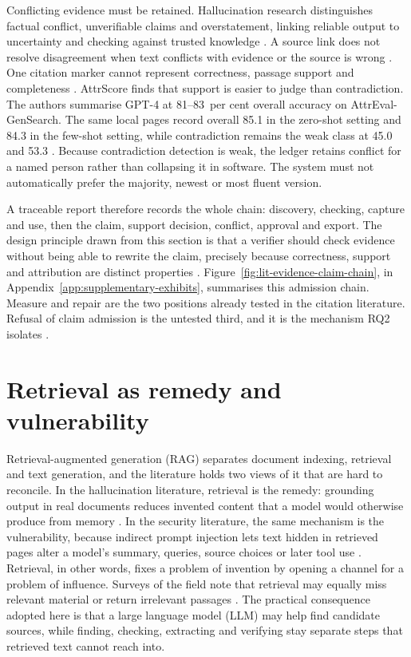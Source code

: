 Conflicting evidence must be retained. Hallucination research distinguishes factual conflict,
unverifiable claims and overstatement, linking reliable output to uncertainty and checking
against trusted knowledge \citep{huang2023hallucination}. A source link does not resolve
disagreement when text conflicts with evidence or the source is wrong \citep{gao2023rarr}. One
citation marker cannot represent correctness, passage support and completeness
\citep{gao2023alce}. AttrScore finds that support is easier to judge than contradiction. The authors summarise GPT-4
at 81--83~per cent overall accuracy on AttrEval-GenSearch. The same local pages record overall
85.1 in the zero-shot setting and 84.3 in the few-shot setting, while contradiction remains the
weak class at 45.0 and 53.3 \citep{yue2023attrscore,huang2023hallucination}. Because contradiction
detection is weak, the ledger retains conflict for a named person rather than collapsing it in
software.
The system must not automatically prefer the majority, newest or most fluent version.

A traceable report therefore records the whole chain: discovery, checking, capture and use, then
the claim, support decision, conflict, approval and export. The design principle drawn from this
section is that a verifier should check evidence without being able to rewrite the claim,
precisely because correctness, support and attribution are distinct properties
\citep{gao2023alce,gao2023rarr,nist2023airmf,amershi2019guidelines}.
Figure~\ref{fig:lit-evidence-claim-chain}, in Appendix~\ref{app:supplementary-exhibits},
summarises this admission chain. Measure and repair are the two positions already tested in the
citation literature. Refusal of claim admission is the untested third, and it is the mechanism
RQ2 isolates \citep{gao2023alce,gao2023rarr}.

\section{Retrieval as remedy and vulnerability}

Retrieval-augmented generation (RAG) separates document indexing, retrieval and text generation,
and the literature holds two views of it that are hard to reconcile. In the hallucination
literature, retrieval is the remedy: grounding output in real documents reduces invented content
that a model would otherwise produce from memory \citep{huang2023hallucination}. In the security
literature, the same mechanism is the vulnerability, because indirect prompt injection lets text
hidden in retrieved pages alter a model's summary, queries, source choices or later tool use
\citep{greshake2023indirect}. Retrieval, in other words, fixes a problem of invention by opening
a channel for a problem of influence. Surveys of the field note that retrieval may equally miss
relevant material or return irrelevant passages \citep{gao2023ragsurvey}. The practical
consequence adopted here is that a large language model (LLM) may help find candidate sources,
while finding, checking, extracting and verifying stay separate steps that retrieved text cannot
reach into.


